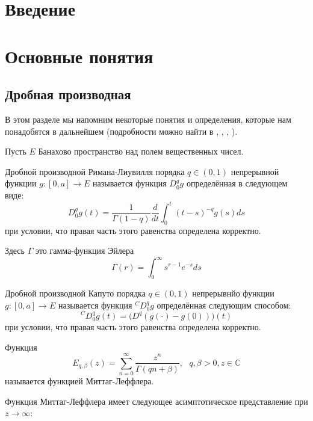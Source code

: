 \section{Введение}

\clearpage

\section{Основные понятия}

\subsection{Дробная производная}

В этом разделе мы напомним некоторые понятия и определения, которые нам понадобятся в дальнейшем
(подробности можно найти в \cite{gorenflo}, \cite{kilbas}, \cite{podlubny}, \cite{zhou}).

Пусть $E$ Банахово пространство над полем вещественных чисел.

\begin{definition}
    Дробной производной Римана-Лиувилля порядка $q \in (0, 1)$ непрерывной функции $g:[0, a] \rightarrow E$ называется
    функция $D_{0}^{q}g$ определённая в следующем виде:
    $$D_{0}^{q}g(t) = \frac{1}{\Gamma(1 - q)}\frac{d}{dt}\int_{0}^{t}(t - s)^{-q}g(s)ds$$
    при условии, что правая часть этого равенства определена корректно.
\end{definition}

Здесь $\Gamma$ это гамма-функция Эйлера $$\Gamma(r) = \int_{0}^{\infty}s^{r-1}e^{-s}ds$$

\begin{definition}
    Дробной производной Капуто порядка $q \in (0, 1)$ непрерывнйо функции $g:[0, a] \rightarrow E$ называется функция
    ${}^CD_{0}^{q}g$ определённая следующим способом:
    $${}^CD_{0}^{q}g(t) = \Big(D^q(g(\cdot) - g(0))\Big)(t)$$
    при условии, что правая часть этого равенства определена корректно.
\end{definition}

\begin{definition}
    Функция
    $$E_{q,\beta}(z) = \sum_{n=0}^{\infty}\frac{z^n}{\Gamma(qn + \beta)}, \ \ \ q, \beta > 0, z \in \mathbb{C}$$
    называется функцией Миттаг-Леффлера.
\end{definition}

Функция Миттаг-Леффлера имеет следующее асимптотическое представление при $z \rightarrow \infty$:

